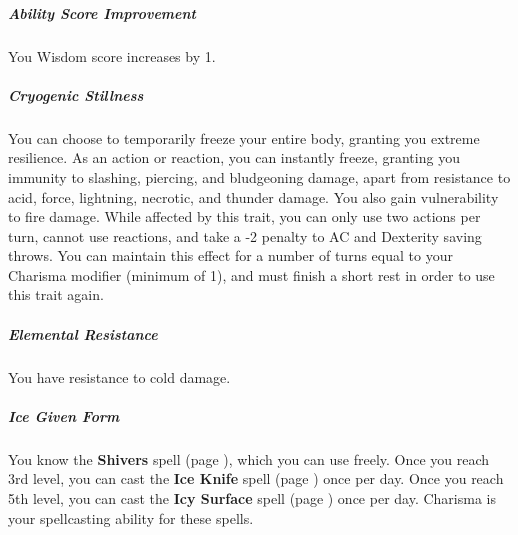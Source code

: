     \subparagraph{Ability Score Improvement}
        You Wisdom score increases by 1.

    \subparagraph{Cryogenic Stillness}
        You can choose to temporarily freeze your entire body, granting you extreme resilience.
        As an action or reaction, you can instantly freeze, granting you immunity to slashing, piercing, and bludgeoning damage, apart from resistance to acid, force, lightning, necrotic, and thunder damage.
        You also gain vulnerability to fire damage.
        While affected by this trait, you can only use two actions per turn, cannot use reactions, and take a -2 penalty to AC and Dexterity saving throws.
        You can maintain this effect for a number of turns equal to your Charisma modifier (minimum of 1), and must finish a short rest in order to use this trait again.

    \subparagraph{Elemental Resistance}
        You have resistance to cold damage.

    \subparagraph{Ice Given Form}
        You know the \textbf{Shivers} spell (page \pageref{spell::shivers}), which you can use freely.
        Once you reach 3rd level, you can cast the \textbf{Ice Knife} spell (page \pageref{spell::iceknife}) once per day.
        Once you reach 5th level, you can cast the \textbf{Icy Surface} spell (page \pageref{spell::icysurface}) once per day.
        Charisma is your spellcasting ability for these spells.


\newpage~\newpage
